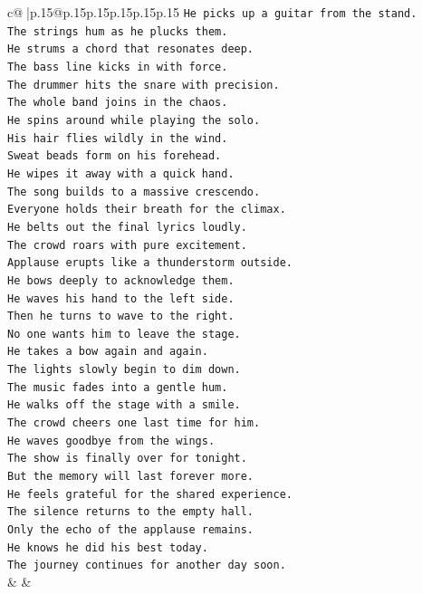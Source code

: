 \documentclass{article}
\begin{document}
{\begin{supertabular}{c@{$\;$}|p{.15\linewidth}@{}p{.15\linewidth}p{.15\linewidth}p{.15\linewidth}p{.15\linewidth}p{.15\linewidth}}
{{{\texttt{He picks up a guitar from the stand.} \\
\texttt{The strings hum as he plucks them.} \\
\texttt{He strums a chord that resonates deep.} \\
\texttt{The bass line kicks in with force.} \\
\texttt{The drummer hits the snare with precision.} \\
\texttt{The whole band joins in the chaos.} \\
\texttt{He spins around while playing the solo.} \\
\texttt{His hair flies wildly in the wind.} \\
\texttt{Sweat beads form on his forehead.} \\
\texttt{He wipes it away with a quick hand.} \\
\texttt{The song builds to a massive crescendo.} \\
\texttt{Everyone holds their breath for the climax.} \\
\texttt{He belts out the final lyrics loudly.} \\
\texttt{The crowd roars with pure excitement.} \\
\texttt{Applause erupts like a thunderstorm outside.} \\
\texttt{He bows deeply to acknowledge them.} \\
\texttt{He waves his hand to the left side.} \\
\texttt{Then he turns to wave to the right.} \\
\texttt{No one wants him to leave the stage.} \\
\texttt{He takes a bow again and again.} \\
\texttt{The lights slowly begin to dim down.} \\
\texttt{The music fades into a gentle hum.} \\
\texttt{He walks off the stage with a smile.} \\
\texttt{The crowd cheers one last time for him.} \\
\texttt{He waves goodbye from the wings.} \\
\texttt{The show is finally over for tonight.} \\
\texttt{But the memory will last forever more.} \\
\texttt{He feels grateful for the shared experience.} \\
\texttt{The silence returns to the empty hall.} \\
\texttt{Only the echo of the applause remains.} \\
\texttt{He knows he did his best today.} \\
\texttt{The journey continues for another day soon.} \\
            }
        }
    }
    & & \\ \\


\end{supertabular}}
\end{document}
